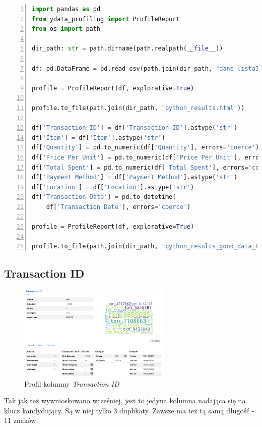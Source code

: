 \documentclass[a4paper,12pt]{article}
\begin{document}
\begin{lstlisting}[language=Python, basicstyle=\ttfamily\small, numbers=left, numberstyle=\tiny, commentstyle=\color{green}]
import pandas as pd
from ydata_profiling import ProfileReport
from os import path

dir_path: str = path.dirname(path.realpath(__file__))

df: pd.DataFrame = pd.read_csv(path.join(dir_path, "dane_lista3.csv"))

profile = ProfileReport(df, explorative=True)

profile.to_file(path.join(dir_path, "python_results.html"))

df['Transaction ID'] = df['Transaction ID'].astype('str')
df['Item'] = df['Item'].astype('str')
df['Quantity'] = pd.to_numeric(df['Quantity'], errors='coerce')
df['Price Per Unit'] = pd.to_numeric(df['Price Per Unit'], errors='coerce')
df['Total Spent'] = pd.to_numeric(df['Total Spent'], errors='coerce')
df['Payment Method'] = df['Payment Method'].astype('str')
df['Location'] = df['Location'].astype('str')
df['Transaction Date'] = pd.to_datetime(
    df['Transaction Date'], errors='coerce')

profile = ProfileReport(df, explorative=True)

profile.to_file(path.join(dir_path, "python_results_good_data_types.html"))
\end{lstlisting}

\subsection{Transaction ID}

\begin{figure}[H]
  \centering
  \includegraphics[width=0.65\textwidth]{images/py_1.png}
  \caption{Profil kolumny \textit{Transaction ID}}
\end{figure}

Tak jak też wywnioskowano wcześniej, jest to jedyna kolumna nadająca się na klucz kandydujący. Są w niej tylko 3 duplikaty. Zawsze ma też tą samą długość - 11 znaków.
\end{document}
